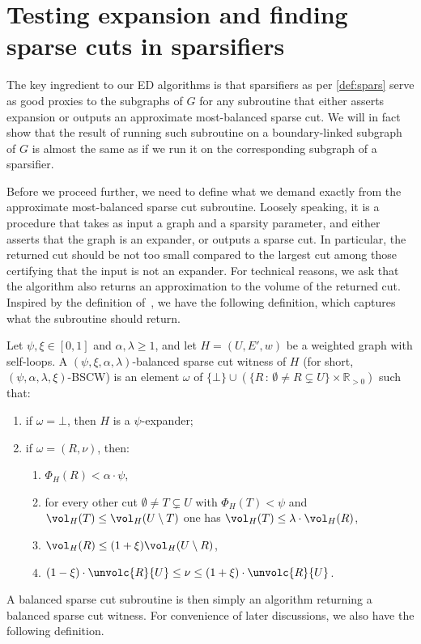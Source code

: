 \section{Testing expansion and finding sparse cuts in sparsifiers}
\label{sec:balsparse}
The key ingredient to our ED algorithms is that sparsifiers as per \cref{def:spars} serve as good proxies to the subgraphs of $G$ for any subroutine that either asserts expansion or outputs an approximate most-balanced sparse cut. We will in fact show that the result of running such subroutine on a boundary-linked subgraph of $G$ is almost the same as if we run it on the corresponding subgraph of a sparsifier.

Before we proceed further, we need to define what we demand exactly from the approximate most-balanced sparse cut subroutine. Loosely speaking, it is a procedure that takes as input a graph and a sparsity parameter, and either asserts that the graph is an expander, or outputs a sparse cut. In particular, the returned cut should be not too small compared to the largest cut among those certifying that the input is not an expander. For technical reasons, we ask that the algorithm also returns an approximation to the volume of the returned cut. Inspired by the definition of~\cite{streamexpdec}, we have the following definition, which captures what the subroutine should return.

\begin{definition}
	\label{def:bscw}
	Let $\psi, \xi \in [0,1]$ and $\alpha,\lambda \ge 1$, and let $H=(U,E',w)$ be a weighted graph with self-loops. A $(\psi,\xi,\alpha,\lambda)$-balanced sparse cut witness of $H$ (for short, $(\psi,\alpha,\lambda,\xi)$-BSCW) is an element $\omega$ of $\{\bot\} \cup (\{R\,:\,\emptyset \neq R \subsetneq U\} \times \mathbb{R}_{>0})$ such that:
	\begin{enumerate}
		\item \label{item:expr} if $\omega = \bot$, then $H$ is a $\psi$-expander;
		\item if $\omega = (R,\nu)$, then:
		\begin{enumerate}
			\item \label{item:sparser} $\Phi_{H}(R) < \alpha \cdot \psi $,
			\item \label{item:balr} for every other cut $\emptyset \neq T \subsetneq U$ with $\Phi_H(T) <  \psi$ and $\vol_H(T) \le \vol_H(U \setminus T)$ one has $\vol_H(T) \le \lambda\cdot \vol_H(R)$,
			\item \label{item:smallsider} $\vol_H(R) \le (1+\xi) \vol_H(U \setminus R)$,
			\item \label{item:goodestimr} $ (1-\xi)  \cdot \unvolc{R}{U} \le \nu \le  (1+\xi)  \cdot \unvolc{R}{U}$.
		\end{enumerate}
	\end{enumerate}
\end{definition}
\noindent
A balanced sparse cut subroutine is then simply an algorithm returning a balanced sparse cut witness. For convenience of later discussions, we also have the following definition.

